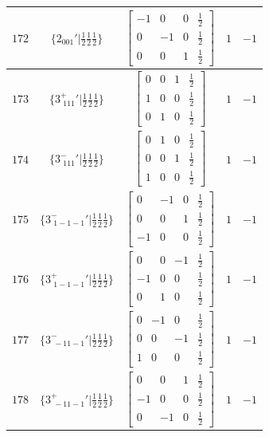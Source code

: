 \documentclass[fleqn,8pt]{jsarticle}
\begin{document}
\begin{longtable}{ccccc}
$ 172 $ & $ \{2{}_{001}{}'|\frac{1}{2} \frac{1}{2} \frac{1}{2}\} $ & $ \begin{bmatrix} -1 & 0 & 0 & \frac{1}{2} \\ 0 & -1 & 0 & \frac{1}{2} \\ 0 & 0 & 1 & \frac{1}{2} \end{bmatrix} $ & $ 1 $ & $ -1 $ \\ \hline
$ 173 $ & $ \{3^{+}_{\,\,111}{}'|\frac{1}{2} \frac{1}{2} \frac{1}{2}\} $ & $ \begin{bmatrix} 0 & 0 & 1 & \frac{1}{2} \\ 1 & 0 & 0 & \frac{1}{2} \\ 0 & 1 & 0 & \frac{1}{2} \end{bmatrix} $ & $ 1 $ & $ -1 $ \\ \hline
$ 174 $ & $ \{3^{-}_{\,\,111}{}'|\frac{1}{2} \frac{1}{2} \frac{1}{2}\} $ & $ \begin{bmatrix} 0 & 1 & 0 & \frac{1}{2} \\ 0 & 0 & 1 & \frac{1}{2} \\ 1 & 0 & 0 & \frac{1}{2} \end{bmatrix} $ & $ 1 $ & $ -1 $ \\ \hline
$ 175 $ & $ \{3^{-}_{\,\,1-1-1}{}'|\frac{1}{2} \frac{1}{2} \frac{1}{2}\} $ & $ \begin{bmatrix} 0 & -1 & 0 & \frac{1}{2} \\ 0 & 0 & 1 & \frac{1}{2} \\ -1 & 0 & 0 & \frac{1}{2} \end{bmatrix} $ & $ 1 $ & $ -1 $ \\ \hline
$ 176 $ & $ \{3^{+}_{\,\,1-1-1}{}'|\frac{1}{2} \frac{1}{2} \frac{1}{2}\} $ & $ \begin{bmatrix} 0 & 0 & -1 & \frac{1}{2} \\ -1 & 0 & 0 & \frac{1}{2} \\ 0 & 1 & 0 & \frac{1}{2} \end{bmatrix} $ & $ 1 $ & $ -1 $ \\ \hline
$ 177 $ & $ \{3^{-}_{\,\,-11-1}{}'|\frac{1}{2} \frac{1}{2} \frac{1}{2}\} $ & $ \begin{bmatrix} 0 & -1 & 0 & \frac{1}{2} \\ 0 & 0 & -1 & \frac{1}{2} \\ 1 & 0 & 0 & \frac{1}{2} \end{bmatrix} $ & $ 1 $ & $ -1 $ \\ \hline
$ 178 $ & $ \{3^{+}_{\,\,-11-1}{}'|\frac{1}{2} \frac{1}{2} \frac{1}{2}\} $ & $ \begin{bmatrix} 0 & 0 & 1 & \frac{1}{2} \\ -1 & 0 & 0 & \frac{1}{2} \\ 0 & -1 & 0 & \frac{1}{2} \end{bmatrix} $ & $ 1 $ & $ -1 $ \\ \hline

\end{longtable}
\end{document}
